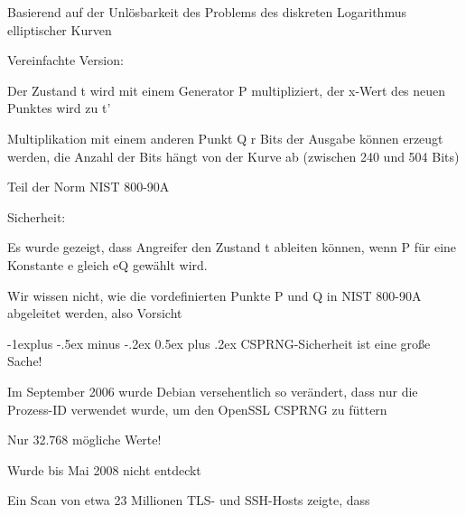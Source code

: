 \documentclass[a4paper]{article}
\makeatletter
\renewcommand{\subsection}{\@startsection{subsection}{2}{0mm}%
 {-1explus -.5ex minus -.2ex}%
 {0.5ex plus .2ex}%
 {\normalfont\normalsize\bfseries}}
\makeatother
\begin{document}
\begin{multicols}{3}
\begin{itemize*}
            \begin{itemize*}
                  \item Basierend auf der Unlösbarkeit des Problems des diskreten Logarithmus elliptischer Kurven
                  \item Vereinfachte Version: %
                  \item Der Zustand t wird mit einem Generator P multipliziert, der x-Wert des neuen Punktes wird zu t'
                  \item Multiplikation mit einem anderen Punkt Q r Bits der Ausgabe können erzeugt werden, die Anzahl der Bits hängt von der Kurve ab (zwischen 240 und 504 Bits)
                  \item Teil der Norm NIST 800-90A
                  \item Sicherheit:
                  \begin{itemize*} \item Es wurde gezeigt, dass Angreifer den Zustand t ableiten können, wenn P für eine Konstante e gleich eQ gewählt wird. \item Wir wissen nicht, wie die vordefinierten Punkte P und Q in NIST 800-90A abgeleitet werden, also Vorsicht \end{itemize*}
            \end{itemize*}
      \end{itemize*}


      \subsection{CSPRNG-Sicherheit ist eine große
            Sache!}

      \begin{itemize*}
            \item
            Im September 2006 wurde Debian versehentlich so verändert, dass nur
            die Prozess-ID verwendet wurde, um den OpenSSL CSPRNG zu füttern

            \begin{itemize*}
                  \item Nur 32.768 mögliche Werte!
                  \item Wurde bis Mai 2008 nicht entdeckt
            \end{itemize*}
            \item
            Ein Scan von etwa 23 Millionen TLS- und SSH-Hosts zeigte, dass


\end{itemize*}
\end{multicols}
\end{document}
